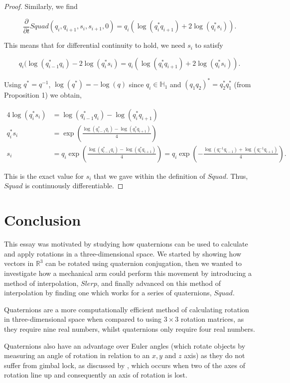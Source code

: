 \documentclass[a4paper, 11pt]{article}
\begin{document}
\begin{proof}
    Similarly, we find 

    \[\frac{\partial}{\partial t} Squad(q_i, q_{i+1}, s_i, s_{i+1}, 0) = q_i(\log(q_i^* q_{i+1}) + 2 \log(q_i^* s_i)). \]

    This means that for differential continuity to hold, we need $s_i$ to satisfy

    \[q_i ( \log(q_{i-1}^* q_i) - 2 \log(q_i^* s_i) = q_i(\log(q_i^* q_{i+1}) + 2 \log(q_i^* s_i)).\]

    Using $q^* = q^{-1}$, $\log(q^*) = -\log(q)$ since $q_i \in \mathbb{H}_1$ and $(q_1q_2)^* = q_2^*q_1^*$ (from Proposition 1)  we obtain, 

    \begin{align*}
    4 \log(q_i^* s_i) &= \log(q_{i-1}^* q_i) - \log(q_i^* q_{i+1}) \\
    q_i^* s_i &= \exp \left( \frac{\log(q_{i-1}^* q_i) - \log(q_i^* q_{i+1})}{4} \right) \\
    s_i &= q_i \exp \left( \frac{\log(q_{i-1}^* q_i) - \log(q_i^* q_{i+1})}{4} \right) = q_i \exp \left( -  \frac{\log(q_i^{-1} q_{i-1}) + \log(q_i^{-1} q_{i+1})}{4} \right).
    \end{align*}

    This is the exact value for $s_i$ that we gave within the definition of $Squad$. Thus, $Squad$ is continuously differentiable.
\end{proof}


\section{Conclusion}

This essay was motivated by studying how quaternions can  be used to calculate and apply rotations in a three-dimensional space. We started by showing how vectors in $\mathbb{R}^3$ can be rotated using quaternion conjugation, then we wanted to investigate how a mechanical arm could perform this movement by introducing a method of interpolation, $Slerp$, and finally advanced on this method of interpolation by finding one which works for a series of quaternions, $Squad$.

Quaternions are a more computationally efficient method of calculating rotation in three-dimensional space when compared to using $3 \times 3$ rotation matrices, as they require nine real numbers, whilst quaternions only require four real numbers.

Quaternions also have an advantage over Euler angles (which rotate objects by measuring an angle of rotation in relation to an $x,y$ and $z$ axis) as they do not suffer from gimbal lock, as discussed by \citet[pp.~31--32]{hemingway_oreilly_2018}, which occurs when two of the axes of rotation line up and consequently an axis of rotation is lost. 
\end{document}
